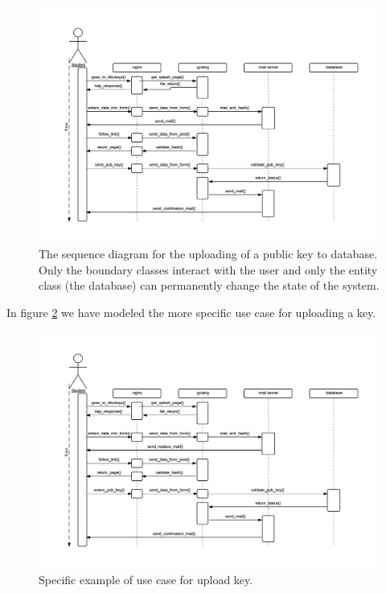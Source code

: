 \documentclass[11pt,a4paper]{report}
\begin{document}
\begin{figure}[H]
    \centering
    \includegraphics[width=1.2\textwidth]{pictures/sequence_diagram_upload}
    \caption{The sequence diagram for the uploading of a public key to database. Only the boundary classes interact with the user and only the entity class (the database) can permanently change the state  of the system.}
    \label{fig:sequence_diagram}
\end{figure}

In figure \ref{fig:use_case_diagram_example_two} we have modeled the more specific use case for uploading a key.

\begin{figure}[H]
    \centering
    \includegraphics[width=1.2\textwidth]{pictures/sequence_diagram_replace}
     \caption{Specific example of use case for upload key.}
    \label{fig:use_case_diagram_example_two}
\end{figure}
\end{document}
